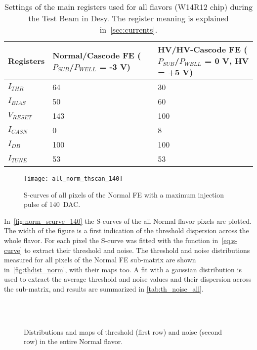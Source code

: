 \begin{table}[h!]
\centering
\begin{tabular}{C{3.2cm}|C{3.7cm}|C{3.5cm}}
\hline
Registers & Normal/Cascode FE ($P_{SUB}$/$P_{WELL}$ = -3 V) & HV/HV-Cascode FE ($P_{SUB}$/$P_{WELL}$ = 0 V, HV = +5 V)\\[2ex]
\hline
\hline
$I_{THR}$ & 64 & 30\\[0.5ex]
\hline
$I_{BIAS}$ & 50 & 60\\
\hline
$V_{RESET}$ & 143 & 100\\
\hline
$I_{CASN}$ & 0 & 8\\
\hline
$I_{DB}$ & 100 & 100\\
\hline
$I_{TUNE}$ & 53 & 53\\
\hline
\hline
\end{tabular}
\caption{Settings of the main registers used for all flavors (W14R12 chip) during the Test Beam in Desy. The register meaning is explained in~\autoref{sec:currents}.}
\label{tab:tb_settings}
\end{table}


\begin{figure}[h!]
\centering
\texttt{[image: all\_norm\_thscan\_140]}
\caption{S-curves of all pixels of the Normal FE with a maximum injection pulse of \SI{140}{DAC}.}
\label{fig:norm_scurve_140}
\end{figure}


In~\autoref{fig:norm_scurve_140} the S-curves of the all Normal flavor pixels are plotted. The width of the figure is a first indication of the threshold dispersion across the whole flavor.
For each pixel the S-curve was fitted with the function in~\autoref{eq:s-curve} to extract their threshold and noise.  
The threshold and noise distributions measured for all pixels of the Normal FE sub-matrix are shown in~\autoref{fig:thdist_norm},  with their maps too. A fit with a gaussian distribution is used to extract the average threshold and noise values and their dispersion across the sub-matrix, and results are summarized in \autoref{tab:th_noise_all}.\\

\begin{figure}[h!]
\centering
{}\quad
{}\\
\quad
{}\\
\caption{Distributions and maps of threshold (first row) and noise (second row) in the entire Normal flavor.}
\label{fig:thdist_norm}
\end{figure}

